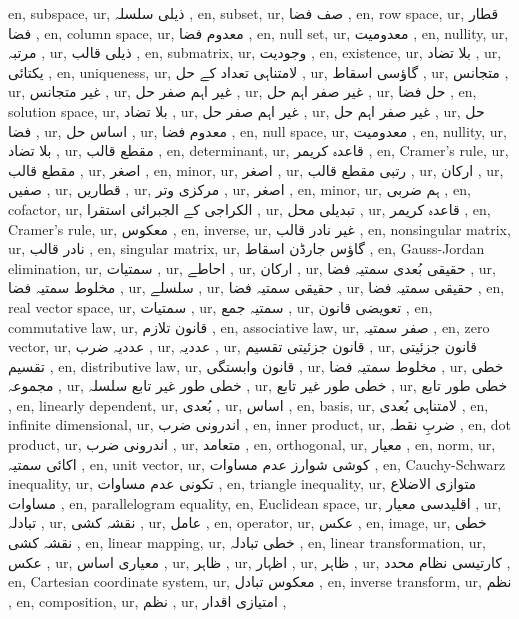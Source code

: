en, subspace,
ur, ذیلی سلسلہ ,
en, subset,
ur, صف فضا ,
en, row space,
ur, قطار فضا ,
en, column space,
ur, معدوم فضا ,
en, null set,
ur, معدومیت ,
en, nullity,
ur, مرتبہ ,
ur, ذیلی قالب ,
en, submatrix,
ur, وجودیت ,
en, existence,
ur, بلا تضاد ,
ur, یکتائی ,
en, uniqueness,
ur, لامتناہی تعداد کے حل ,
ur, گاؤسی اسقاط ,
ur, متجانس ,
ur, غیر متجانس ,
ur, غیر اہم صفر حل ,
ur, غیر صفر اہم حل ,
ur, حل فضا ,
en, solution space,
ur, بلا تضاد ,
ur, غیر اہم صفر حل ,
ur, غیر صفر اہم حل ,
ur, حل فضا ,
ur, اساس حل ,
ur, معدوم فضا ,
en, null space,
ur, معدومیت ,
en, nullity,
ur, بلا تضاد ,
ur, مقطع قالب ,
en, determinant,
ur, قاعدہ کریمر ,
en, Cramer's rule,
ur, مقطع قالب ,
ur, اصغر ,
en, minor,
ur, اصغر ,
ur,  رتبی مقطع قالب ,
ur, ارکان ,
ur, صفیں ,
ur, قطاریں ,
ur, مرکزی وتر ,
ur, اصغر ,
en, minor,
ur, ہم ضربی ,
en, cofactor,
ur, الکراجی کے الجبرائی استقرا ,
ur, تبدیلی محل ,
ur, قاعدہ کریمر ,
en, Cramer's rule,
ur, معکوس ,
en, inverse,
ur, غیر نادر قالب ,
en, nonsingular matrix,
ur, نادر قالب ,
en, singular matrix,
ur, گاؤس جارڈن اسقاط ,
en, Gauss-Jordan elimination,
ur, سمتیات ,
ur, احاطے ,
ur, ارکان ,
ur, حقیقی  بُعدی سمتیہ فضا ,
ur, مخلوط سمتیہ فضا ,
ur, سلسلے ,
ur, حقیقی سمتیہ فضا ,
ur, حقیقی سمتیہ فضا ,
en, real vector space,
ur, سمتیات ,
ur, سمتیہ جمع ,
ur, تعویضی قانون ,
en, commutative law,
ur, قانون تلازم ,
en, associative law,
ur, صفر سمتیہ ,
en, zero vector,
ur, عددیہ ضرب ,
ur, عددیہ ,
ur, قانون جزئیتی تقسیم ,
ur, قانون جزئیتی تقسیم ,
en, distributive law,
ur, قانون وابستگی ,
ur, مخلوط سمتیہ فضا ,
ur, خطی مجموعہ ,
ur, خطی طور غیر تابع سلسلہ ,
ur, خطی طور غیر تابع ,
ur, خطی طور تابع ,
en, linearly dependent,
ur,  بُعدی ,
ur, اساس ,
en, basis,
ur, لامتناہی بُعدی ,
en, infinite dimensional,
ur, اندرونی ضرب ,
en, inner product,
ur, ضربِ نقطہ ,
en, dot product,
ur, اندرونی ضرب ,
ur, متعامد ,
en, orthogonal,
ur, معیار ,
en, norm,
ur, اکائی سمتیہ ,
en, unit vector,
ur, کوشی شوارز عدم مساوات ,
en, Cauchy-Schwarz inequality,
ur, تکونی عدم مساوات ,
en, triangle inequality,
ur, متوازی الاضلاع مساوات ,
en, parallelogram equality,
en, Euclidean space,
ur, اقلیدسی معیار ,
ur, تبادلہ ,
ur, نقشہ کشی ,
ur, عامل ,
en, operator,
ur, عکس ,
en, image,
ur, خطی نقشہ کشی ,
en, linear mapping,
ur, خطی تبادلہ ,
en, linear transformation,
ur, عکس ,
ur, معیاری اساس ,
ur, ظاہر ,
ur, اظہار ,
ur, ظاہر ,
ur, کارتیسی نظام محدد ,
en, Cartesian coordinate system,
ur, معکوس تبادل ,
en, inverse transform,
ur, نظم ,
en, composition,
ur, نظم ,
ur, امتیازی اقدار ,
